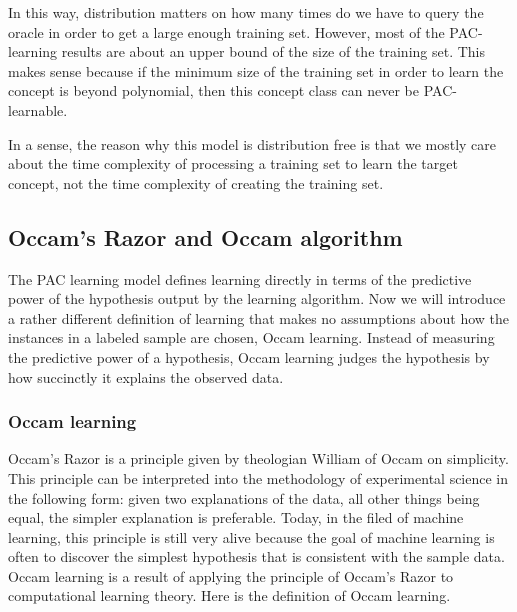 \documentclass[12pt]{article}
\begin{document}
\begin{enumerate}
    In this way, distribution matters on how many times do we have to query the oracle in order to get a large enough training set. However, most of the PAC-learning results are about an upper bound of the size of the training set. This makes sense because if the minimum size of the training set in order to learn the concept is beyond polynomial, then this concept class can never be PAC-learnable.

    In a sense, the reason why this model is distribution free is that we mostly care about the time complexity of processing a training set to learn the target concept, not the time complexity of creating the training set.

\end{enumerate}

\subsection{Occam's Razor and Occam algorithm}


The PAC learning model defines learning directly in terms of the predictive power of the hypothesis output by the learning algorithm. Now we will introduce a rather different definition of learning that makes no assumptions about how the instances in a labeled sample are chosen, Occam learning. Instead of measuring the predictive power of a hypothesis, Occam learning judges the hypothesis by how succinctly it explains the observed data.

\subsubsection{Occam learning}

Occam's Razor is a principle given by theologian William of Occam on simplicity. This principle can be interpreted into the methodology of experimental science in the following form: given two explanations of the data, all other things being equal, the simpler explanation is preferable. Today, in the filed of machine learning, this principle is still very alive because the goal of machine learning is often to discover the simplest hypothesis that is consistent with the sample data. \\

Occam learning is a result of applying the principle of Occam's Razor to computational learning theory. Here is the definition of Occam learning.
\end{document}
